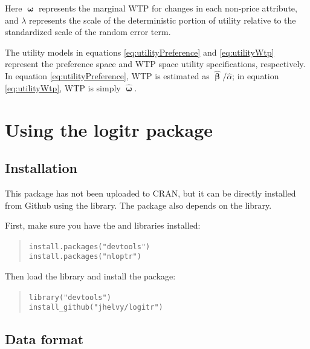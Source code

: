 \documentclass[article]{jss}
\begin{document}


Here \(\boldsymbol\upomega\) represents the marginal WTP for changes in
each non-price attribute, and \(\lambda\) represents the scale of the
deterministic portion of utility relative to the standardized scale of
the random error term.

The utility models in equations \ref{eq:utilityPreference} and
\ref{eq:utilityWtp} represent the preference space and WTP space utility
specifications, respectively. In equation \ref{eq:utilityPreference},
WTP is estimated as \(\hat{\boldsymbol\upbeta} / \hat{\alpha}\); in
equation \ref{eq:utilityWtp}, WTP is simply
\(\hat{\boldsymbol\upomega}\).

\newpage

\hypertarget{using-the-logitr-package}{%
\section{Using the logitr package}\label{using-the-logitr-package}}

\hypertarget{installation}{%
\subsection{Installation}\label{installation}}

This package has not been uploaded to CRAN, but it can be directly
installed from Github using the  library. The package also
depends on the  library.

First, make sure you have the  and  libraries
installed:

\begin{quote}
\texttt{install.packages("devtools")}~\\
\texttt{install.packages("nloptr")}
\end{quote}

Then load the  library and install the 
package:

\begin{quote}
\texttt{library("devtools")}~\\
\texttt{install\_github("jhelvy/logitr")}
\end{quote}

\hypertarget{data-format}{%
\subsection{Data format}\label{data-format}}
\end{document}

